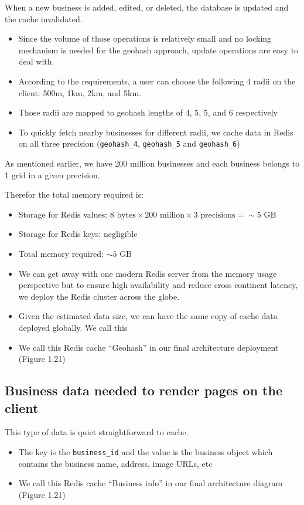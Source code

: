 \documentclass{report}
\theoremstyle{definition}
\let\oldsubsection\subsection
\renewcommand{\subsection}{\oldsubsection*}
\begin{document}
When a new business is added, edited, or deleted, the database is updated and the cache invalidated.

\begin{itemize}
\item
Since the volume of those operations is relatively small and no locking mechanism is needed for the geohash approach, update operations
are easy to deal with.
\item
According to the requirements, a user can choose the following 4 radii on the client: 500m, 1km, 2km, and 5km.
\item
Those radii are mapped to geohash lengths of 4, 5, 5, and 6 respectively
\item
To quickly fetch nearby businesses for different radii, we cache data in Redis on all three precision (\lstinline|geohash_4|, \lstinline|geohash_5| and \lstinline|geohash_6|)
\end{itemize}

As mentioned earlier, we have 200 million businesses and each business belongs to 1 grid in a given precision.

Therefor the total memory required is:

\begin{itemize}
\item
Storage for Redis values: $8 \text{ bytes} \times 200 \text{ million} \times 3 \text{ precisions} = \sim 5 \text{ GB }$
\item
Storage for Redis keys: negligible
\item
Total memory required: $\sim 5 \text{ GB } $
\item
We can get away with one modern Redis server from the memory usage perspective but to ensure high availability and reduce cross continent latency, we deploy the Redis cluster across the globe.
\item
Given the estimated data size, we can have the same copy of cache data deployed globally. We call this
\item
We call this Redis cache ``Geohash'' in our final architecture deployment (Figure 1.21)
\end{itemize}

\subsection{Business data needed to render pages on the client}

This type of data is quiet straightforward to cache.

\begin{itemize}
\item
The key is the \lstinline|business_id| and the value is the business object which contains the business name, address, image URLs, etc
\item
We call this Redis cache ``Business info'' in our final architecture diagram (Figure 1.21)
\end{itemize}
\end{document}
